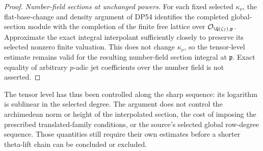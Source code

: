 \begin{proof}
\emph{Number-field sections at unchanged powers.}
For each fixed selected $\kappa_\nu$, the flat-base-change and density argument of DP54 identifies the completed global-section module with the completion of the finite free lattice over $\mathcal O_{\Q(\zeta_7),\mathfrak p}$.
Approximate the exact integral interpolant sufficiently closely to preserve its selected nonzero finite valuation.
This does not change $\kappa_\nu$, so the tensor-level estimate remains valid for the resulting number-field section integral at $\mathfrak p$.
Exact equality of arbitrary $p$-adic jet coefficients over the number field is not asserted.
\end{proof}

The tensor level has thus been controlled along the sharp sequence: its logarithm is sublinear in the selected degree. The argument does not control the archimedean norm or height of the interpolated section, the cost of imposing the prescribed translated-family conditions, or the source's selected global row-degree sequence. Those quantities still require their own estimates before a shorter theta-lift chain can be concluded or excluded.
